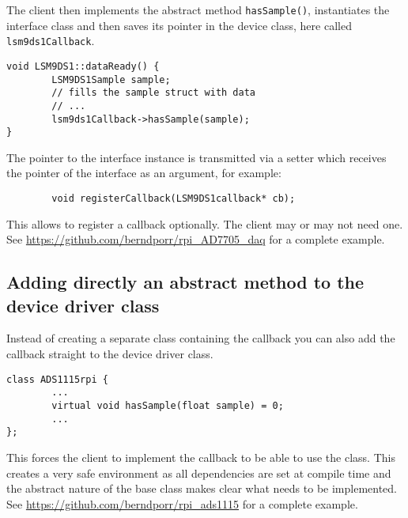 \documentclass[12pt]{report}
\begin{document}
The client then implements the abstract method \texttt{hasSample()}, instantiates
the interface class and then saves its pointer in the device class, here called \texttt{lsm9ds1Callback}.
\begin{verbatim}
void LSM9DS1::dataReady() {
        LSM9DS1Sample sample;
        // fills the sample struct with data
        // ...
        lsm9ds1Callback->hasSample(sample);
}
\end{verbatim}
The pointer to the interface instance is transmitted via a setter which
receives the pointer of the interface as an argument, for example:
\begin{verbatim}
        void registerCallback(LSM9DS1callback* cb);
\end{verbatim}
This allows to register a callback optionally. The client may or may not need
one.
See
\url{https://github.com/berndporr/rpi_AD7705_daq}
for a complete example.

\subsection{Adding directly an abstract method to the device driver class}
Instead of creating a separate class containing the callback you
can also add the callback straight to the device driver class.
\begin{verbatim}
class ADS1115rpi {
        ...
        virtual void hasSample(float sample) = 0;
        ...
};
\end{verbatim}
This forces the client to implement the callback to be able to use
the class. This creates a very safe environment as all dependencies
are set at compile time and the abstract nature of the base class
makes clear what needs to be implemented.
See
\url{https://github.com/berndporr/rpi_ads1115} for a complete example.
\end{document}
